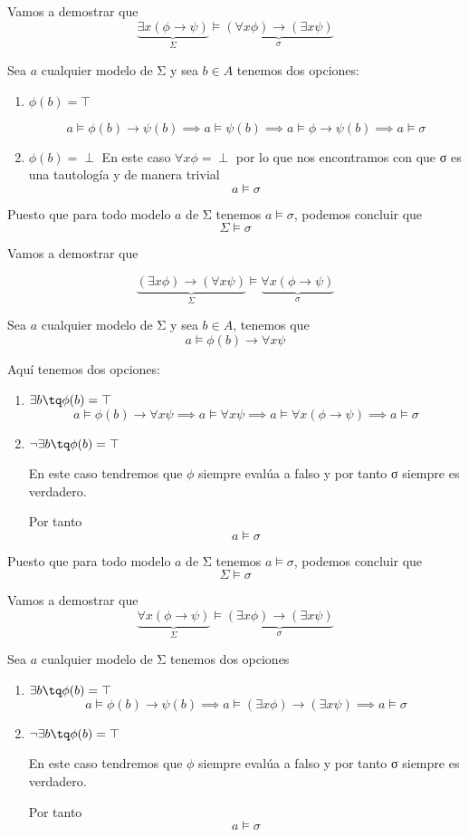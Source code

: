 \begin{problem}
\spart

Vamos a demostrar que
\[\underbrace{\exists x (\phi \to \psi)}_{Σ} \models \underbrace{(\forall x  \phi ) \to  (\exists x \psi)}_{σ}\]

Sea $a$ cualquier modelo de Σ y sea $b \in A$ tenemos dos opciones:
\begin{enumerate}
\item $\phi(b) = \top$

\[a \models \phi(b) \to \psi(b) \implies a \models \psi(b) \implies a \models \phi \to \psi(b) \implies a \models σ\]
\item $\phi(b) = \perp$
En este caso $\forall x \phi = \perp$ por lo que nos encontramos con que σ es una tautología y de manera trivial
\[a \models σ\]
\end{enumerate}

Puesto que para todo modelo $a$ de Σ tenemos $a \models σ$, podemos concluir que
\[Σ \models σ\]

\spart

Vamos a demostrar que

\[\underbrace{(\exists x  \phi ) \to  (\forall x \psi)}_{Σ} \models \underbrace{ \forall x (\phi  \to \psi)}_{σ} \]

Sea $a$ cualquier modelo de Σ y sea $b \in A$, tenemos que
\[a \models \phi(b) \to \forall x \psi \]

Aquí tenemos dos opciones:
\begin{enumerate}
\item $\exists b \tq \phi(b)=\top$
\[a \models \phi(b) \to \forall x \psi \implies a \models \forall x \psi \implies a \models \forall x (\phi \to \psi) \implies a \models σ\]
\item $\neg \exists b \tq \phi(b) = \top$

En este caso tendremos que $\phi$ siempre evalúa a falso y por tanto σ siempre es verdadero.

Por tanto
\[a \models σ\]
\end{enumerate}

Puesto que para todo modelo $a$ de Σ tenemos $a \models σ$, podemos concluir que
\[Σ \models σ\]

\spart

Vamos a demostrar que
\[\underbrace{\forall x (\phi \to \psi)}_{Σ} \models \underbrace{(\exists x  \phi )\to  (\exists x \psi)}_{σ}\]

Sea $a$ cualquier modelo de Σ tenemos dos opciones
\begin{enumerate}
\item $\exists b \tq \phi(b)=\top$
\[a \models \phi(b) \to \psi (b) \implies a \models (\exists x \phi) \to (\exists x \psi) \implies a \models σ\]
\item $\neg \exists b \tq \phi(b) = \top$

En este caso tendremos que $\phi$ siempre evalúa a falso y por tanto σ siempre es verdadero.

Por tanto
\[a \models σ\]
\end{enumerate}
\end{problem}

